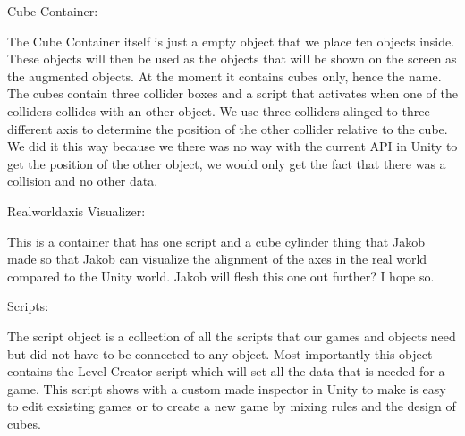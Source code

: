 Cube Container:

The Cube Container itself is just a empty object that we place ten objects inside. These objects will then be used as the objects that will be shown on the screen as the augmented objects. At the moment it contains cubes only, hence the name.
The cubes contain three collider boxes and a script that activates when one of the colliders collides with an other object. We use three colliders alinged to three different axis to determine the position of the other collider relative to the cube. We did it this way because we there was no way with the current API in Unity to get the position of the other object, we would only get the fact that there was a collision and no other data.

Realworldaxis Visualizer:

This is a container that has one script and a cube cylinder thing that Jakob made so that Jakob can visualize the alignment of the axes in the real world compared to the Unity world.
Jakob will flesh this one out further? I hope so.

Scripts:

The script object is a collection of all the scripts that our games and objects need but did not have to be connected to any object. Most importantly this object contains the Level Creator script which will set all the data that is needed for a game. This script shows with a custom made inspector in Unity to make is easy to edit exsisting games or to create a new game by mixing rules and the design of cubes.
